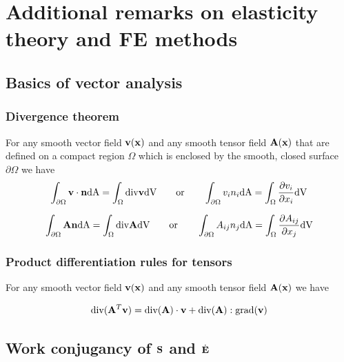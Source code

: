 

\chapter{Additional remarks on elasticity theory and FE methods} 

\section{Basics of vector analysis} 

\subsection{Divergence theorem}
\label{ADivergenceTheorem}
For any smooth vector field $\mathbf {v} (\mathbf {x} )$ and any smooth tensor field $\mathbf{A}(\mathbf {x} )$ that are defined on a compact region $\Omega$ which is enclosed by the smooth, closed surface $\partial \Omega$ we have
\begin{eqnarray}
\int _{\partial \Omega} \mathbf {v}  \cdot \mathbf {n}   \textnormal{dA} = \int _{\Omega}  \textnormal{div} \mathbf {v}   \textnormal{dV} \qquad \textnormal{or} \qquad \int _{\partial \Omega} v_i n_i  \textnormal{dA} = \int _{\Omega} \frac{\partial v_i}{\partial x_i}  \textnormal{dV}
\end{eqnarray}

\begin{eqnarray}
\int _{\partial \Omega} \mathbf{A}  \mathbf {n}   \textnormal{dA} = \int _{\Omega}  \textnormal{div} \mathbf{A}  \textnormal{dV} \qquad \textnormal{or} \qquad \int _{\partial \Omega} A_{ij} n_j  \textnormal{dA} = \int _{\Omega} \frac{\partial A_{ij}}{\partial x_j}  \textnormal{dV}
\end{eqnarray}

\subsection{Product differentiation rules for tensors}
\label{AProductRule}
For any smooth vector field $\mathbf {v} (\mathbf {x} )$ and any smooth tensor field $\mathbf{A}(\mathbf {x} )$ we have

\begin{eqnarray}
 \textnormal{div}(\mathbf{A}^T \mathbf {v} ) =  \textnormal{div}(\mathbf{A}) \cdot \mathbf {v}  +  \textnormal{div}(\mathbf{A}) :  \textnormal{grad}( \mathbf {v} )
\end{eqnarray}

\section{Work conjugancy of $\mathbf {S} $ and $\dot{\mathbf {E} }$} 
\label{WorkConjugancySE}

